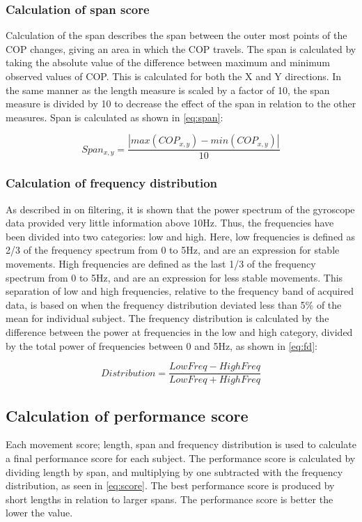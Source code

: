 \subsubsection{Calculation of span score}
Calculation of the span describes the span between the outer most points of the COP changes, giving an area in which the COP travels. 
The span is calculated by taking the absolute value of the difference between maximum and minimum observed values of COP. This is calculated for both the X and Y directions. In the same manner as the length measure is scaled by a factor of 10, the span measure is divided by 10 to decrease the effect of the span in relation to the other measures. Span is calculated as shown in \eqref{eq:span}:

\begin{equation}
Span_{x,y} = \frac{\left| max(COP_{x,y})-min(COP_{x,y})\right|}{10}
\end{equation}


\subsubsection{Calculation of frequency distribution}
As described in  on filtering, it is shown that the power spectrum of the gyroscope data provided very little information above 10Hz. Thus, the frequencies have been divided into two categories: low and high. Here, low frequencies is defined as 2/3 of the frequency spectrum from 0 to 5Hz, and are an expression for stable movements. High frequencies are defined as the last 1/3 of the frequency spectrum from 0 to 5Hz, and are an expression for less stable movements. This separation of low and high frequencies, relative to the frequency band of acquired data, is based on when the frequency distribution deviated less than 5\% of the mean for individual subject. The frequency distribution is calculated by the difference between the power at frequencies in the low and high category, divided by the total power of frequencies between 0 and 5Hz, as shown in \eqref{eq:fd}:

\begin{equation} \label{eq:fd}
Distribution = \frac{LowFreq-HighFreq}{LowFreq+HighFreq}
\end{equation}


\subsection{Calculation of performance score}
Each movement score; length, span and frequency distribution is used to calculate a final performance score for each subject. 
The performance score is calculated by dividing length by span, and multiplying by one subtracted with the frequency distribution, as seen in \eqref{eq:score}. The best performance score is produced by short lengths in relation to larger spans. The performance score is better the lower the value. 

